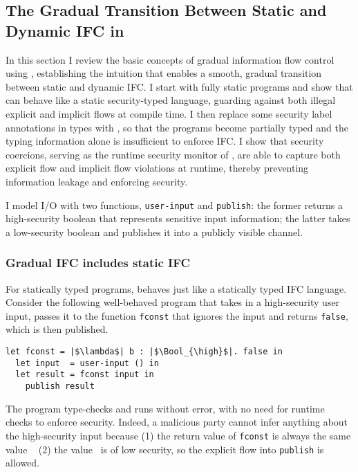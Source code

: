 \subsection{The Gradual Transition Between Static and Dynamic IFC in \Surface}
\label{sec:example1}

In this section I review the basic concepts of gradual information flow control
using \Surface, establishing the intuition that \Surface enables a smooth,
gradual transition between static and dynamic IFC. I start with fully static
\Surface programs and show that \Surface can behave like a static security-typed
language, guarding against both illegal explicit and implicit flows at compile
time. I then replace some security label annotations in types with \unk, so that
the programs become partially typed and the typing information alone is
insufficient to enforce IFC. I show that security coercions, serving as the
runtime security monitor of \Surface, are able to capture both explicit flow and
implicit flow violations at runtime, thereby preventing information leakage and
enforcing security.

I model I/O with two functions, \texttt{user-input} and \texttt{publish}: the
former returns a high-security boolean that represents sensitive input
information; the latter takes a low-security boolean and publishes it into a
publicly visible channel.

\subsubsection{Gradual IFC includes static IFC}

For statically typed programs, \Surface behaves just like a statically
typed IFC language. Consider the following well-behaved \Surface
program that takes in a high-security user input, passes it to the
function \texttt{fconst} that ignores the input and
returns \texttt{false}, which is then published.

\begin{lstlisting}[style=tt]
  let fconst = |$\lambda$| b : |$\Bool_{\high}$|. false in
  let input  = user-input () in
  let result = fconst input in
    publish result
\end{lstlisting}

The program type-checks and runs without error, with no need for
runtime checks to enforce security. Indeed, a malicious party cannot
infer anything about the high-security input because (1) the return
value of \texttt{fconst} is always the same value \false~ (2)
the value \false~is of low security, so the explicit flow
into \texttt{publish} is allowed.

